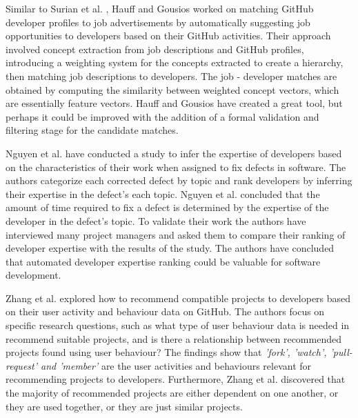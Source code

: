         Similar to Surian et al. \cite{surian2011recommending}, Hauff and Gousios \cite{hauff2015matching} worked on matching GitHub developer profiles to job advertisements by automatically suggesting job opportunities to developers based on their GitHub activities. Their approach involved concept extraction from job descriptions and GitHub profiles, introducing a weighting system for the concepts extracted to create a hierarchy, then matching job descriptions to developers. The job - developer matches are obtained by computing the similarity between weighted concept vectors, which are essentially feature vectors. Hauff and Gousios have created a great tool, but perhaps it could be improved with the addition of a formal validation and filtering stage for the candidate matches.

        Nguyen et al. \cite{nguyen2012inferring} have conducted a study to infer the expertise of developers based on the characteristics of their work when assigned to fix defects in software. The authors categorize each corrected defect by topic and rank developers by inferring their expertise in the defect’s each topic. Nguyen et al. concluded that the amount of time required to fix a defect is determined by the expertise of the developer in the defect's topic. To validate their work the authors have interviewed many project managers and asked them to compare their ranking of developer expertise with the results of the study. The authors have concluded that automated developer expertise ranking could be valuable for software development. 
        
        Zhang et al. \cite{zhang2014recommending} explored how to recommend compatible projects to developers based on their user activity and behaviour data on GitHub. The authors focus on specific research questions, such as what type of user behaviour data is needed in recommend suitable projects, and is there a relationship between recommended projects found using user behaviour? The findings show that \emph{'fork', 'watch', 'pull-request' and 'member'} are the user activities and behaviours relevant for recommending projects to developers. Furthermore, Zhang et al. discovered that the majority of recommended projects are either dependent on one another, or they are used together, or they are just similar projects.
        
